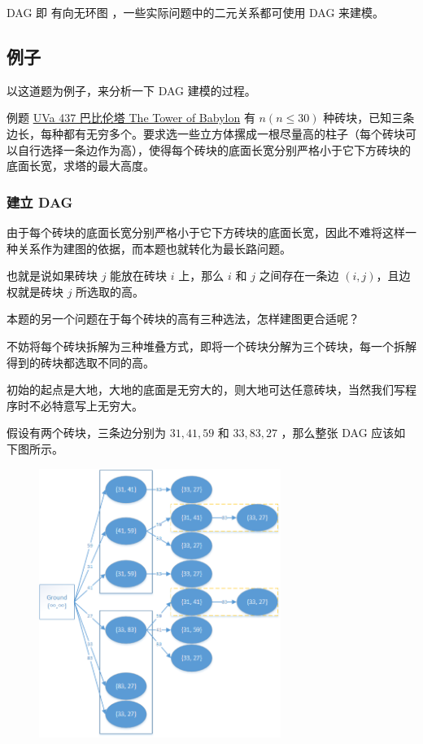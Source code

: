 
DAG 即 有向无环图 ，一些实际问题中的二元关系都可使用 DAG 来建模。

\subsection{例子}

以这道题为例子，来分析一下 DAG 建模的过程。

\begin{NOTE}{例题 \href{https://cn.vjudge.net/problem/UVA-437}{UVa 437 巴比伦塔 The Tower of Babylon}}{}
有 $n (n\leqslant 30)$ 种砖块，已知三条边长，每种都有无穷多个。要求选一些立方体摞成一根尽量高的柱子（每个砖块可以自行选择一条边作为高），使得每个砖块的底面长宽分别严格小于它下方砖块的底面长宽，求塔的最大高度。

\end{NOTE}


\subsubsection{建立 DAG}

由于每个砖块的底面长宽分别严格小于它下方砖块的底面长宽，因此不难将这样一种关系作为建图的依据，而本题也就转化为最长路问题。

也就是说如果砖块 $j$ 能放在砖块 $i$ 上，那么 $i$ 和 $j$ 之间存在一条边 $(i, j)$，且边权就是砖块 $j$ 所选取的高。

本题的另一个问题在于每个砖块的高有三种选法，怎样建图更合适呢？

不妨将每个砖块拆解为三种堆叠方式，即将一个砖块分解为三个砖块，每一个拆解得到的砖块都选取不同的高。

初始的起点是大地，大地的底面是无穷大的，则大地可达任意砖块，当然我们写程序时不必特意写上无穷大。

假设有两个砖块，三条边分别为 $31, 41, 59$ 和 $33, 83, 27$ ，那么整张 DAG 应该如下图所示。

\begin{figure}[htbp]
\centering
\includegraphics[width=0.7\textwidth]{docs/dp/images/dag-babylon.png} 

\end{figure}

